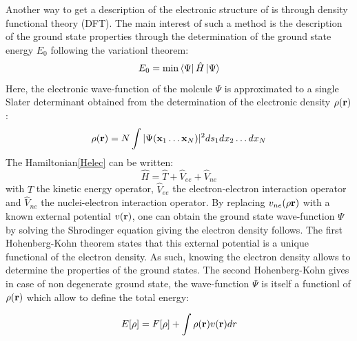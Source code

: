 \documentclass[10pt]{report}
\numberwithin{equation}{section}
\begin{document}
Another way to get a description of the electronic structure of is through density functional theory (DFT).
The main interest of such a method is the description of the ground state properties through the determination of the ground state energy $E_0$ following the variationl theorem:
\begin{equation}
    E_0 = \min \bra{\Psi} \hat{H} \ket{\Psi}
\end{equation}
Here, the electronic wave-function of the molcule $\Psi$ is approximated to a single Slater determinant obtained from the determination of the electronic density $\rho(\vb r)$:
\begin{equation}
    \rho(\vb r)=N\int |\Psi(\vb x_1 \ldots \vb x_N)|^2 ds_1 dx_2 \ldots dx_N
\end{equation}
The Hamiltonian\ref{Helec} can be written:
\begin{equation}\label{Hop}
    \hat{H}=\hat{T} + \hat{V}_{ee} + \hat{V}_{ne}
\end{equation} 
with $\hat{T}$ the kinetic energy operator, $\hat{V}_{ee}$ the electron-electron interaction operator and $\hat{V}_{ne}$ the nuclei-electron interaction operator. 
By replacing $v_{ne}(\rho\vb r)$ with a known external potential $v(\vb r)$, one can obtain the ground state wave-function $\Psi$ by solving the Shrodinger equation giving the electron density follows.
The first Hohenberg-Kohn theorem states that this external potential is a unique functional of the electron density.
As such, knowing the electron density allows to determine the properties of the ground states.
The second Hohenberg-Kohn gives in case of non degenerate ground state, the wave-function $\Psi$ is itself a functionl of $\rho(\vb r)$ which allow to define the total energy:

\begin{equation}\label{EnergyDFT}
    E[\rho]= F[\rho]+ \int \rho(\vb r) v(\vb r)dr
\end{equation}
\end{document}
